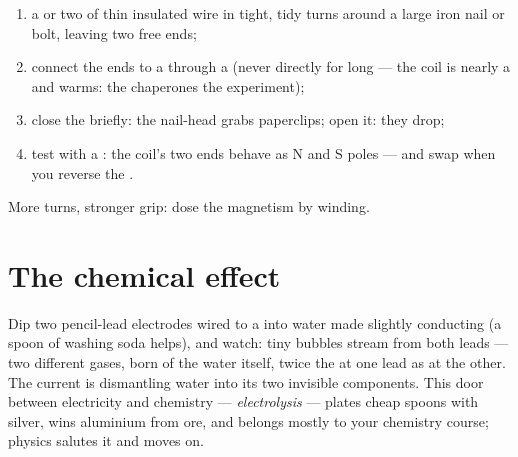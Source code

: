 \begin{method}\label{met:g8:electric-current-effects:wind}
\begin{enumerate}
  \item {} a  or two of thin insulated wire in tight,
        tidy turns around a large iron nail or bolt, leaving two
        free ends;
  \item connect the ends to a  through a  (never
        directly for long --- the coil is nearly a  and warms: the  chaperones the
        experiment);
  \item close the  briefly: the nail-head grabs
        paperclips; open it: they drop;
  \item test with a : the coil's two ends behave as N and
        S poles --- and swap when you reverse the .
\end{enumerate}
More turns, stronger grip: dose the magnetism by winding.
\end{method}

\section{The chemical effect}

\begin{example}\label{ex:g8:electric-current-effects:electrolysis}
Dip two pencil-lead electrodes wired to a  into water
made slightly conducting (a spoon of washing soda helps), and
watch: tiny bubbles stream from both leads --- two different
gases, born of the water itself, twice the  at one lead
as at the other. The current is dismantling water into its two
invisible components. This door between electricity and
chemistry --- \emph{electrolysis} --- plates cheap spoons with
silver, wins aluminium from ore, and belongs mostly to your
chemistry course; physics salutes it and moves on.
\end{example}


